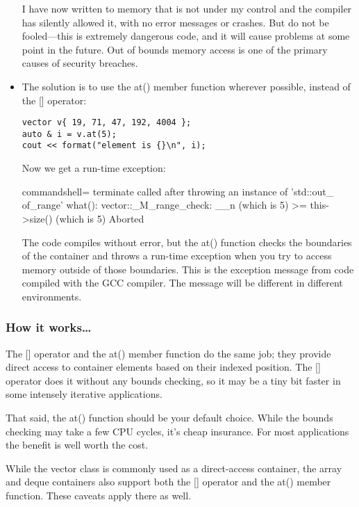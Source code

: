 \begin{itemize}
I have now written to memory that is not under my control and the compiler has silently allowed it, with no error messages or crashes. But do not be fooled—this is extremely dangerous code, and it will cause problems at some point in the future. Out of bounds memory access is one of the primary causes of security breaches.

\item 
The solution is to use the at() member function wherever possible, instead of the [] operator:

\begin{lstlisting}[style=styleCXX]
vector v{ 19, 71, 47, 192, 4004 };
auto & i = v.at(5);
cout << format("element is {}\n", i);
\end{lstlisting}

Now we get a run-time exception:

\begin{tcblisting}{commandshell={}}
terminate called after throwing an instance of 'std::out_
of_range'
	what(): vector::_M_range_check: __n (which is 5) >=
this->size() (which is 5)
Aborted
\end{tcblisting}

The code compiles without error, but the at() function checks the boundaries of the container and throws a run-time exception when you try to access memory outside of those boundaries. This is the exception message from code compiled with the GCC compiler. The message will be different in different environments.
\end{itemize}

\subsubsection{How it works…}

The [] operator and the at() member function do the same job; they provide direct access to container elements based on their indexed position. The [] operator does it without any bounds checking, so it may be a tiny bit faster in some intensely iterative applications.

That said, the at() function should be your default choice. While the bounds checking may take a few CPU cycles, it's cheap insurance. For most applications the benefit is well worth the cost.

While the vector class is commonly used as a direct-access container, the array and deque containers also support both the [] operator and the at() member function. These caveats apply there as well.

